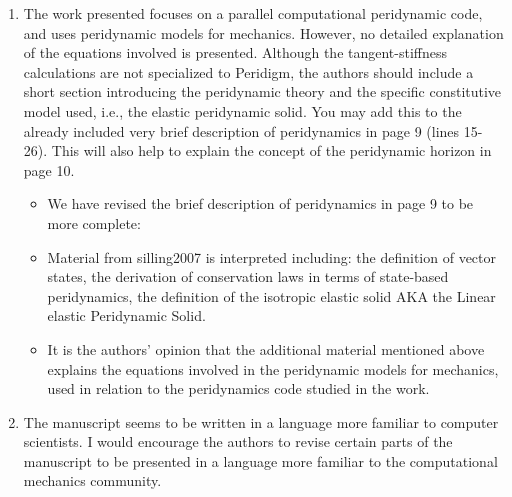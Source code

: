 \documentclass{article}
\begin{document}
\begin{enumerate}
{\begin{itemize}
  \end{itemize}}

    \item
        The work presented focuses on a parallel computational peridynamic code, and
        uses peridynamic models for mechanics. However, no detailed explanation of the
        equations involved is presented. Although the tangent-stiffness calculations are
        not specialized to Peridigm, the authors should include a short section introducing
        the peridynamic theory and the specific constitutive model used, i.e., the elastic
        peridynamic solid. You may add this to the already included very brief description
        of peridynamics in page 9 (lines 15-26). This will also help to explain the concept
        of the peridynamic horizon in page 10.

{\color{red}
  \begin{itemize}
    \item 
        We have revised the brief description of peridynamics in page 9 to be more complete:
    \item
        Material from silling2007 is interpreted including: the definition of vector states,
        the derivation of conservation laws in terms of state-based peridynamics, the definition
        of the isotropic elastic solid AKA the Linear elastic Peridynamic Solid.
    \item
        It is the authors' opinion that the additional material mentioned above explains the equations involved
        in the peridynamic models for mechanics, used in relation to the peridynamics code
        studied in the work. 

  \end{itemize}}
    \item 
        The manuscript seems to be written in a language more familiar to computer scientists. 
        I would encourage the authors to revise certain parts of the manuscript to be
        presented in a language more familiar to the computational mechanics community.


\end{enumerate}
\end{document}
